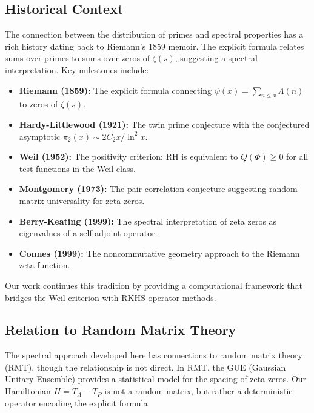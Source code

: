\subsection{Historical Context}

The connection between the distribution of primes and spectral properties has a rich history dating back to Riemann's 1859 memoir. The explicit formula relates sums over primes to sums over zeros of $\zeta(s)$, suggesting a spectral interpretation. Key milestones include:

\begin{itemize}
  \item \textbf{Riemann (1859):} The explicit formula connecting $\psi(x) = \sum_{n \leq x} \Lambda(n)$ to zeros of $\zeta(s)$.

  \item \textbf{Hardy-Littlewood (1921):} The twin prime conjecture with the conjectured asymptotic $\pi_2(x) \sim 2C_2 x/\ln^2 x$.

  \item \textbf{Weil (1952):} The positivity criterion: RH is equivalent to $Q(\Phi) \geq 0$ for all test functions in the Weil class.

  \item \textbf{Montgomery (1973):} The pair correlation conjecture suggesting random matrix universality for zeta zeros.

  \item \textbf{Berry-Keating (1999):} The spectral interpretation of zeta zeros as eigenvalues of a self-adjoint operator.

  \item \textbf{Connes (1999):} The noncommutative geometry approach to the Riemann zeta function.
\end{itemize}

Our work continues this tradition by providing a computational framework that bridges the Weil criterion with RKHS operator methods.

\subsection{Relation to Random Matrix Theory}

The spectral approach developed here has connections to random matrix theory (RMT), though the relationship is not direct. In RMT, the GUE (Gaussian Unitary Ensemble) provides a statistical model for the spacing of zeta zeros. Our Hamiltonian $H = T_A - T_P$ is not a random matrix, but rather a deterministic operator encoding the explicit formula.

